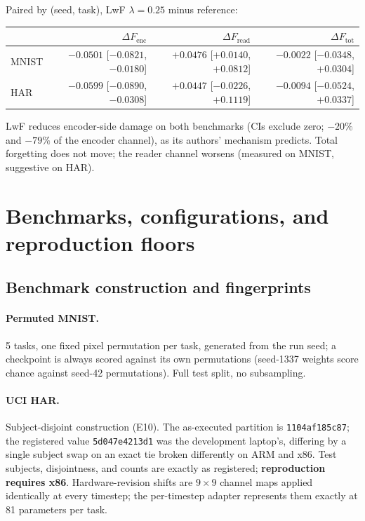 Paired by (seed, task), LwF $\lambda{=}0.25$ minus reference:

\begin{center}\small
\begin{tabular}{@{}lrrr@{}}
\toprule
 & $\Delta F_{\mathrm{enc}}$ & $\Delta F_{\mathrm{read}}$ & $\Delta F_{\mathrm{tot}}$ \\
\midrule
MNIST & $\mathbf{-0.0501}$ [$-0.0821$, $-0.0180$] & $+0.0476$ [$+0.0140$, $+0.0812$] & $-0.0022$ [$-0.0348$, $+0.0304$] \\
HAR   & $\mathbf{-0.0599}$ [$-0.0890$, $-0.0308$] & $+0.0447$ [$-0.0226$, $+0.1119$] & $-0.0094$ [$-0.0524$, $+0.0337$] \\
\bottomrule
\end{tabular}
\end{center}

LwF reduces encoder-side damage on both benchmarks (CIs exclude zero;
$-20\%$ and $-79\%$ of the encoder channel), as its authors' mechanism
predicts. Total forgetting does not move; the reader channel worsens (measured
on MNIST, suggestive on HAR).

\section{Benchmarks, configurations, and reproduction floors}
\label{app:floors}

\subsection{Benchmark construction and fingerprints}

\paragraph{Permuted MNIST.} 5 tasks, one fixed pixel permutation per task,
generated from the run seed; a checkpoint is always scored against its own
permutations (seed-1337 weights score chance against seed-42 permutations).
Full test split, no subsampling.

\paragraph{UCI HAR.} Subject-disjoint construction (E10). The as-executed
partition is \texttt{1104af185c87}; the registered value \texttt{5d047e4213d1}
was the development laptop's, differing by a single subject swap on an exact tie
broken differently on ARM and x86. Test subjects, disjointness, and counts are
exactly as registered; \textbf{reproduction requires x86}. Hardware-revision
shifts are $9\times9$ channel maps applied identically at every timestep;
the per-timestep adapter represents them exactly at 81 parameters per task.

